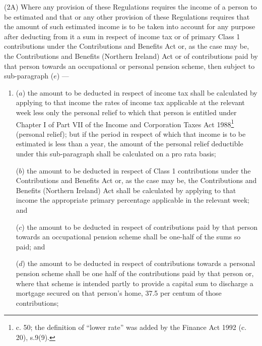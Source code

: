 \documentclass[12pt,a4paper]{article}
\begin{document}
(2A) Where any provision of these Regulations requires the income of a person to be estimated and that or any other provision of these Regulations requires that the amount of such estimated income is to be taken into account for any purpose after deducting from it a sum in respect of income tax or of primary Class 1 contributions under the Contributions and Benefits Act 
or, as the case may be, the Contributions and Benefits (Northern Ireland) Act  %
or of contributions paid by that person towards an occupational or personal pension scheme, then
subject to sub-paragraph ($e$)%
---
\begin{enumerate}\item[]
($a$) the amount to be deducted in respect of income tax shall be calculated by applying to that income the rates of income tax applicable at the 
relevant week  %
less only the personal relief to which that person is entitled under Chapter I of Part VII of the Income and Corporation Taxes Act 1988\footnote{ c. 50; the definition of “lower rate” was added by the Finance Act 1992 (c. 20), s.9(9).} (personal relief); but if the period in respect of which that income is to be estimated is less than a year, the amount of the personal relief deductible under this sub-paragraph shall be calculated on a pro rata basis;

($b$) the amount to be deducted in respect of Class 1 contributions under the Contributions and Benefits Act 
or, as the case may be, the Contributions and Benefits (Northern Ireland) Act  %
shall be calculated by applying to that income the appropriate primary percentage applicable in the relevant week; and

($c$) the amount to be deducted in respect of contributions paid by that person towards an occupational 
pension scheme shall be one-half of the sums so 
paid; and  %

($d$) the amount to be deducted in respect of contributions towards a personal pension scheme shall be one half of the contributions paid by that person or, where that scheme is intended partly to provide a capital sum to discharge a mortgage secured on that person’s home, 37.5 per centum of those contributions;


\end{enumerate}
\end{document}
